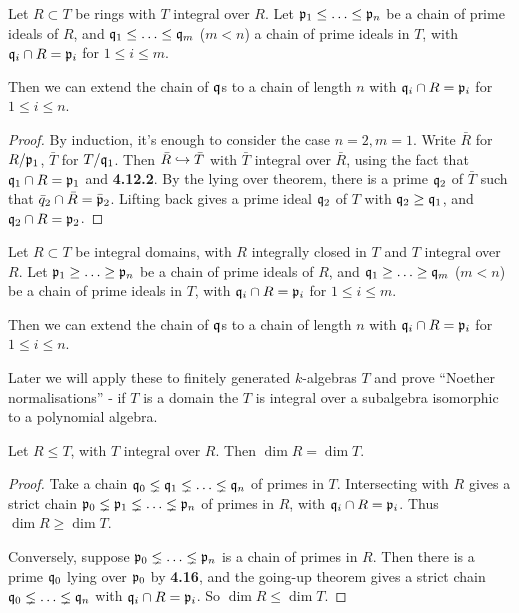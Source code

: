 \documentclass[10pt,a4paper]{article}
\begin{document}
\begin{theorem}
  Let $R \subset T$ be rings with $T$ integral over $R$. Let $\mathfrak{p}_1 \leq \ldots \leq \mathfrak{p}_n$ be a chain of prime ideals of $R$, and $\mathfrak{q}_1 \leq \ldots \leq \mathfrak{q}_m$ ($m<n$) a chain of prime ideals in $T$, with $\mathfrak{q}_i \cap R = \mathfrak{p}_i$ for $1\leq i \leq m$.

  Then we can extend the chain of $\mathfrak{q}$s to a chain of length $n$ with $\mathfrak{q}_i \cap R = \mathfrak{p}_i$ for $1 \leq i \leq n$.
\end{theorem}
\begin{proof}
  By induction, it's enough to consider the case $n = 2, m=1$. Write $\bar{R}$ for $R/\mathfrak{p}_1$, $\bar{T}$ for $T/\mathfrak{q}_1$. Then $\bar{R} \hookrightarrow \bar{T}$ with $\bar{T}$ integral over $\bar{R}$, using the fact that $\mathfrak{q}_1 \cap R = \mathfrak{p}_1$ and \textbf{4.12.2}. By the lying over theorem, there is a prime $\mathfrak{q}_2$ of $\bar{T}$ such that $\bar{q}_2 \cap \bar{R} = \bar{\mathfrak{p}}_2$. Lifting back gives a prime ideal $\mathfrak{q}_2$ of $T$ with $\mathfrak{q}_2 \geq \mathfrak{q}_1$, and $\mathfrak{q}_2 \cap R = \mathfrak{p}_2$.
\end{proof}
\begin{theorem}
  Let $R \subset T$ be integral domains, with $R$ integrally closed in $T$ and $T$ integral over $R$. Let $\mathfrak{p}_1 \geq \ldots \geq \mathfrak{p}_n$ be a chain of prime ideals of $R$, and $\mathfrak{q}_1 \geq \ldots \geq \mathfrak{q}_m$ ($m<n$) be a chain of prime ideals in $T$, with $\mathfrak{q}_i \cap R = \mathfrak{p}_i$ for $1 \leq i \leq m$.

  Then we can extend the chain of $\mathfrak{q}$s to a chain of length $n$ with $\mathfrak{q}_i \cap R = \mathfrak{p}_i$ for $1 \leq i \leq n$.
\end{theorem}
Later we will apply these to finitely generated $k$-algebras $T$ and prove ``Noether normalisations'' - if $T$ is a domain the $T$ is integral over a subalgebra isomorphic to a polynomial algebra.

\begin{corollary}[of going up]
  Let $R \leq T$, with $T$ integral over $R$. Then $\dim R = \dim T$.
\end{corollary}
\begin{proof}
  Take a chain $\mathfrak{q}_0 \lneq \mathfrak{q}_1 \lneq \ldots \lneq \mathfrak{q}_n$ of primes in $T$. Intersecting with $R$ gives a strict chain $\mathfrak{p}_0 \lneq \mathfrak{p}_1 \lneq \ldots \lneq \mathfrak{p}_n$ of primes in $R$, with $\mathfrak{q}_i \cap R = \mathfrak{p}_i$. Thus $\dim R \geq \dim T$.

  Conversely, suppose $\mathfrak{p}_0 \lneq \ldots \lneq \mathfrak{p}_n$ is a chain of primes in $R$. Then there is a prime $\mathfrak{q}_0$ lying over $\mathfrak{p}_0$ by \textbf{4.16}, and the going-up theorem gives a strict chain $\mathfrak{q}_0 \lneq \ldots \lneq \mathfrak{q}_n$ with $\mathfrak{q}_i \cap R = \mathfrak{p}_i$. So $\dim R \leq \dim T$.
\end{proof}
\end{document}
